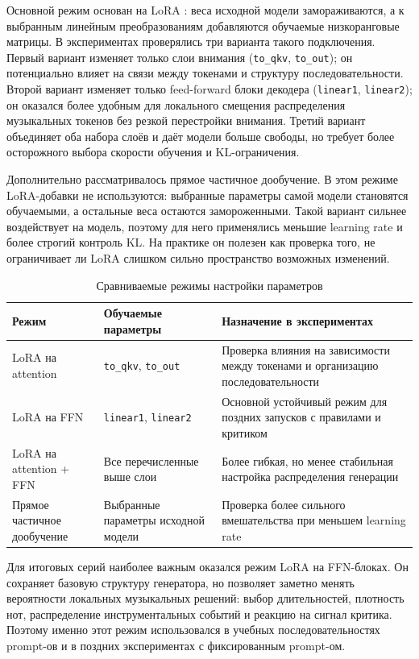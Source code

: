 \documentclass[a4paper,12pt]{extarticle}
\begin{document}
Основной режим основан на LoRA \cite{hu2021lora}: веса исходной модели
замораживаются, а к выбранным линейным преобразованиям добавляются обучаемые
низкоранговые матрицы. В экспериментах проверялись три варианта такого
подключения. Первый вариант изменяет только слои внимания
(\texttt{to\_qkv}, \texttt{to\_out}); он потенциально влияет на связи между
токенами и структуру последовательности. Второй вариант изменяет только
feed-forward блоки декодера (\texttt{linear1}, \texttt{linear2}); он оказался
более удобным для локального смещения распределения музыкальных токенов без
резкой перестройки внимания. Третий вариант объединяет оба набора слоёв и
даёт модели больше свободы, но требует более осторожного выбора скорости
обучения и KL-ограничения.

Дополнительно рассматривалось прямое частичное дообучение. В этом режиме
LoRA-добавки не используются: выбранные параметры самой модели становятся
обучаемыми, а остальные веса остаются замороженными. Такой вариант сильнее
воздействует на модель, поэтому для него применялись меньшие learning rate и
более строгий контроль KL. На практике он полезен как проверка того, не
ограничивает ли LoRA слишком сильно пространство возможных изменений.

\begin{table}[h]
\centering
\caption{Сравниваемые режимы настройки параметров}
\label{tab:adaptation-strategies}
\begin{tabular}{|p{}|p{}|p{}|}
\hline
\textbf{Режим} & \textbf{Обучаемые параметры} & \textbf{Назначение в экспериментах} \\
\hline
LoRA на attention & \texttt{to\_qkv}, \texttt{to\_out} &
Проверка влияния на зависимости между токенами и организацию последовательности \\
\hline
LoRA на FFN & \texttt{linear1}, \texttt{linear2} &
Основной устойчивый режим для поздних запусков с правилами и критиком \\
\hline
LoRA на attention + FFN & Все перечисленные выше слои &
Более гибкая, но менее стабильная настройка распределения генерации \\
\hline
Прямое частичное дообучение & Выбранные параметры исходной модели &
Проверка более сильного вмешательства при меньшем learning rate \\
\hline
\end{tabular}
\end{table}

Для итоговых серий наиболее важным оказался режим LoRA на FFN-блоках. Он
сохраняет базовую структуру генератора, но позволяет заметно менять
вероятности локальных музыкальных решений: выбор длительностей, плотность нот,
распределение инструментальных событий и реакцию на сигнал критика. Поэтому
именно этот режим использовался в учебных последовательностях prompt-ов и в
поздних экспериментах с фиксированным prompt-ом.
\end{document}

